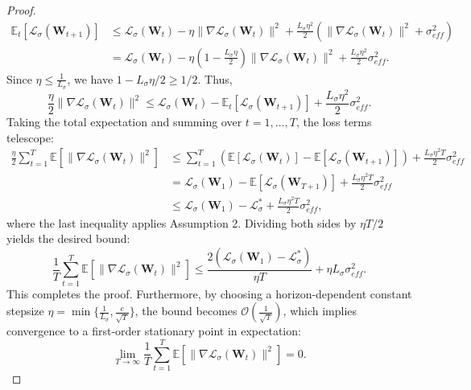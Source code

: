 \documentclass{article}
\begin{document}
\begin{proof}
\begin{equation}
\begin{aligned}
    \mathbb{E}_t[\mathcal{L}_\sigma(\boldsymbol{W}_{t+1})]
    &\leq \mathcal{L}_\sigma(\boldsymbol{W}_t) - \eta \|\nabla \mathcal{L}_\sigma(\boldsymbol{W}_t)\|^2 + \frac{L_\sigma\eta^2}{2} \left( \|\nabla \mathcal{L}_\sigma(\boldsymbol{W}_t)\|^2 + \sigma_{eff}^2 \right) \\
    &= \mathcal{L}_\sigma(\boldsymbol{W}_t) - \eta\left(1-\frac{L_\sigma\eta}{2}\right) \|\nabla \mathcal{L}_\sigma(\boldsymbol{W}_t)\|^2 + \frac{L_\sigma\eta^2}{2}\sigma_{eff}^2.
\end{aligned}
\end{equation}
Since $\eta \leq \frac{1}{L_\sigma}$, we have $1-L_\sigma\eta/2 \geq 1/2$. Thus,
\begin{equation}
    \frac{\eta}{2} \|\nabla \mathcal{L}_\sigma(\boldsymbol{W}_t)\|^2 \leq \mathcal{L}_\sigma(\boldsymbol{W}_t) - \mathbb{E}_t[\mathcal{L}_\sigma(\boldsymbol{W}_{t+1})] + \frac{L_\sigma\eta^2}{2}\sigma_{eff}^2.
\end{equation}
Taking the total expectation and summing over $t=1,\ldots,T$, the loss terms telescope:
\begin{equation}
\begin{aligned}
    \frac{\eta}{2}\sum_{t=1}^{T} \mathbb{E}\left[\|\nabla \mathcal{L}_\sigma(\boldsymbol{W}_t)\|^2\right]
    &\leq \sum_{t=1}^{T} \left( \mathbb{E}[\mathcal{L}_\sigma(\boldsymbol{W}_t)] - \mathbb{E}[\mathcal{L}_\sigma(\boldsymbol{W}_{t+1})] \right) + \frac{L_\sigma\eta^2T}{2}\sigma_{eff}^2 \\
    &= \mathcal{L}_\sigma(\boldsymbol{W}_1) - \mathbb{E}[\mathcal{L}_\sigma(\boldsymbol{W}_{T+1})] + \frac{L_\sigma\eta^2T}{2}\sigma_{eff}^2 \\
    &\leq \mathcal{L}_\sigma(\boldsymbol{W}_1) - \mathcal{L}_\sigma^* + \frac{L_\sigma\eta^2T}{2}\sigma_{eff}^2,
\end{aligned}
\end{equation}
where the last inequality applies Assumption 2. Dividing both sides by $\eta T/2$ yields the desired bound:
\begin{equation}
    \frac{1}{T} \sum_{t=1}^{T} \mathbb{E}\left[\|\nabla \mathcal{L}_\sigma(\boldsymbol{W}_t)\|^2\right] \leq \frac{2(\mathcal{L}_\sigma(\boldsymbol{W}_1) - \mathcal{L}_\sigma^*)}{\eta T} + \eta L_\sigma \sigma_{eff}^2.
\end{equation}
This completes the proof. Furthermore, by choosing a horizon-dependent constant stepsize $\eta = \min\{\frac{1}{L_\sigma}, \frac{c}{\sqrt{T}}\}$, the bound becomes $\mathcal{O}(\frac{1}{\sqrt{T}})$, which implies convergence to a first-order stationary point in expectation:
\begin{equation}
    \lim_{T \to \infty} \frac{1}{T} \sum_{t=1}^{T} \mathbb{E}\left[\|\nabla \mathcal{L}_\sigma(\boldsymbol{W}_t)\|^2\right] = 0.
\end{equation}
\end{proof}
\end{document}
